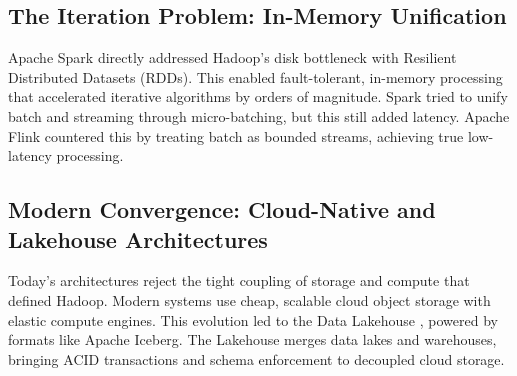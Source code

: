 \subsection{The Iteration Problem: In-Memory Unification}
Apache Spark \cite{zaharia2012resilient} directly addressed Hadoop's disk bottleneck with Resilient Distributed Datasets (RDDs). This enabled fault-tolerant, in-memory processing that accelerated iterative algorithms by orders of magnitude. Spark tried to unify batch and streaming through micro-batching, but this still added latency. Apache Flink countered this by treating batch as bounded streams, achieving true low-latency processing.

\subsection{Modern Convergence: Cloud-Native and Lakehouse Architectures}
Today's architectures reject the tight coupling of storage and compute that defined Hadoop. Modern systems use cheap, scalable cloud object storage with elastic compute engines. This evolution led to the Data Lakehouse \cite{armbrust2021lakehouse}, powered by formats like Apache Iceberg. The Lakehouse merges data lakes and warehouses, bringing ACID transactions and schema enforcement to decoupled cloud storage.